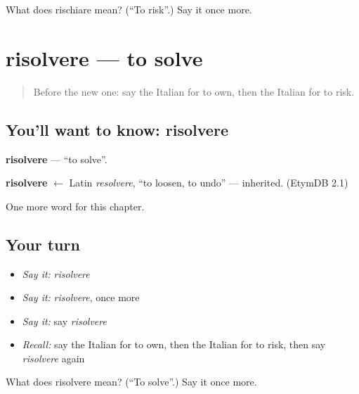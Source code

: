 \begin{tcolorbox}[breakable,colback=teal!4,colframe=teal!35!black,title={Before you move on}]
What does rischiare mean? (\textquotedblleft{}To risk\textquotedblright{}.) Say it once more.
\end{tcolorbox}
\section[risolvere]{risolvere — to solve}

\label{lesson:IT-C181-risolvere}



\begin{quote}
Before the new one: say the Italian for to own, then the Italian for to risk.
\end{quote}

\subsection*{You'll want to know: risolvere}
\textbf{risolvere} — \textquotedblleft{}to solve\textquotedblright{}.

\begin{cousinweb}
\textbf{risolvere} $\leftarrow$ Latin \emph{resolvere}, \textquotedblleft{}to loosen, to undo\textquotedblright{} — inherited. (EtymDB 2.1)
\end{cousinweb}

\begin{grammarlens}[title={What you've built}]
One more word for this chapter.
\end{grammarlens}

\subsection*{Your turn}
\begin{itemize}
\raggedright
  \item \emph{Say it:} \emph{risolvere}
  \item \emph{Say it:} \emph{risolvere}, once more
  \item \emph{Say it:} say \emph{risolvere}
  \item \emph{Recall:} say the Italian for to own, then the Italian for to risk, then say \emph{risolvere} again
\end{itemize}

\begin{tcolorbox}[breakable,colback=teal!4,colframe=teal!35!black,title={Before you move on}]
What does risolvere mean? (\textquotedblleft{}To solve\textquotedblright{}.) Say it once more.
\end{tcolorbox}
